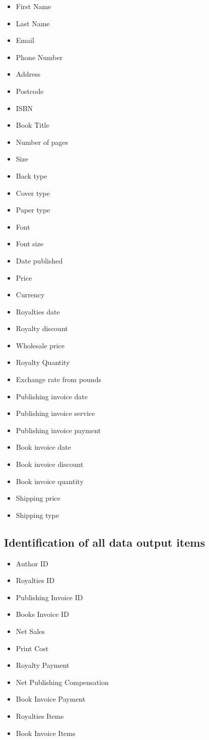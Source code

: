 \begin{itemize}
    \item First Name
    \item Last Name
    \item Email
    \item Phone Number
    \item Address
    \item Postcode
    \item ISBN
    \item Book Title
    \item Number of pages
    \item Size
    \item Back type
    \item Cover type
    \item Paper type
    \item Font
    \item Font size
    \item Date published
    \item Price
    \item Currency
    \item Royalties date
    \item Royalty discount
    \item Wholesale price
    \item Royalty Quantity
    \item Exchange rate from pounds
    \item Publishing invoice date
    \item Publishing invoice service
    \item Publishing invoice payment
    \item Book invoice date
    \item Book invoice discount
    \item Book invoice quantity
    \item Shipping price
    \item Shipping type
\end{itemize}

\subsection{Identification of all data output items}

\begin{itemize}
    \item Author ID
    \item Royalties ID
    \item Publishing Invoice ID
    \item Books Invoice ID
    \item Net Sales
    \item Print Cost
    \item Royalty Payment
    \item Net Publishing Compensation
    \item Book Invoice Payment
    \item Royalties Items
    \item Book Invoice Items
\end{itemize}

